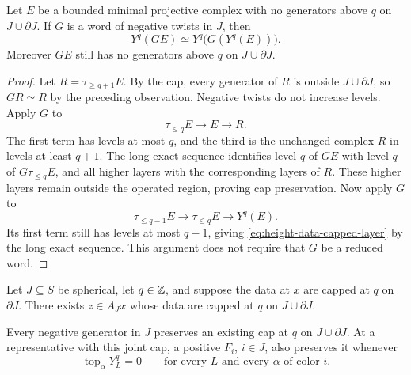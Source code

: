 \begin{lemma}
\label{lem:height-data-capped-layer}
Let $E$ be a bounded minimal projective complex with no
generators above $q$ on $J\cup\partial J$.  If $G$ is a
word of negative twists in $J$, then
\begin{equation}
 Y^q(GE)\simeq Y^q\bigl(G(Y^q(E))\bigr).
 \label{eq:height-data-capped-layer}
\end{equation}
Moreover $GE$ still has no generators above $q$ on
$J\cup\partial J$.
\end{lemma}

\begin{proof}
Let $R=\tau_{\geq q+1}E$.  By the cap, every generator of
$R$ is outside $J\cup\partial J$, so $GR\simeq R$ by the
preceding observation.  Negative twists do not increase
levels.  Apply $G$ to
\[
 \tau_{\leq q}E\longrightarrow E\longrightarrow R.
\]
The first term has levels at most $q$, and the third is the
unchanged complex $R$ in levels at least $q+1$.  The long
exact sequence identifies level $q$ of $GE$ with level $q$
of $G\tau_{\leq q}E$, and all higher layers with the
corresponding layers of $R$.  These higher layers remain
outside the operated region, proving cap preservation.
Now apply $G$ to
\[
 \tau_{\leq q-1}E\longrightarrow\tau_{\leq q}E
       \longrightarrow Y^q(E).
\]
Its first term still has levels at most $q-1$, giving
\eqref{eq:height-data-capped-layer} by the long exact
sequence.  This argument does not require that $G$ be a
reduced word.
\end{proof}

\begin{lemma}\label{lem:cap-accessibility}
Let $J\subseteq S$ be spherical, let $q\in\mathbb Z$, and suppose
the data at $x$ are capped at $q$ on $\partial J$.  There
exists $z\in A_Jx$ whose data are capped at $q$ on
$J\cup\partial J$.

Every negative generator in $J$ preserves an existing cap
at $q$ on $J\cup\partial J$.  At a representative with
this joint cap, a positive $F_i$, $i\in J$, also preserves
it whenever
\[
 \operatorname{top}_\alpha Y_L^q=0
 \qquad\text{for every $L$ and every $\alpha$ of color $i$}.
\]
\end{lemma}

